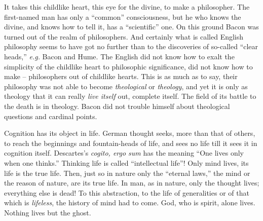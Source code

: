 \documentclass[12pt,a4paper]{book}
\begin{document}
\noindent{}It takes this childlike heart, this eye for the divine, to make a 
philosopher. The first-named man has only a ``common'' consciousness, but he 
who knows the divine, and knows how to tell it, has a ``scientific'' one. On 
this ground Bacon was turned out of the realm of philosophers. And certainly 
what is called English philosophy seems to have got no further than to the 
discoveries of so-called ``clear heads,'' \textit{e.g.} Bacon and Hume. The 
English did not know how to exalt the simplicity of the childlike heart to 
philosophic significance, did not know how to make -- philosophers out of 
childlike hearts. This is as much as to say, their philosophy was not able to 
become \textit{theological} or \textit{theology}, and yet it is only as 
theology that it can really \textit{live itself} out, complete itself. The 
field of its battle to the death is in theology. Bacon did not trouble himself 
about theological questions and cardinal points.

Cognition has its object in life. German thought seeks, more than that of 
others, to reach the beginnings and fountain-heads of life, and sees no life 
till it sees it in cognition itself. Descartes's \textit{cogito, ergo sum} has 
the meaning ``One lives only when one thinks.'' Thinking life is called 
``intellectual life''! Only mind lives, its life is the true life. Then, 
just so in nature only the ``eternal laws,'' the mind or the reason of 
nature, are its true life. In man, as in nature, only the thought lives; 
everything else is dead! To this abstraction, to the life of generalities or 
of that which is \textit{lifeless}, the history of mind had to come. God, who 
is spirit, alone lives. Nothing lives but the ghost.
\end{document}
